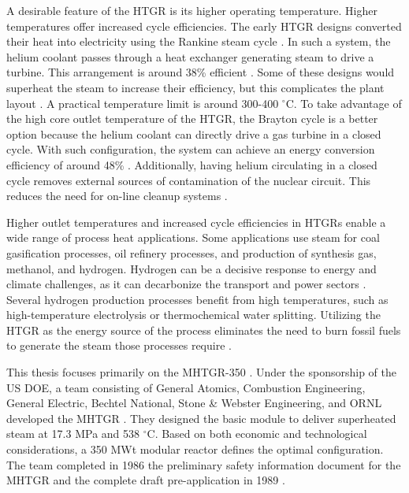 A desirable feature of the \gls{HTGR} is its higher operating temperature.
Higher temperatures offer increased cycle efficiencies.
The early \gls{HTGR} designs converted their heat into electricity using the Rankine steam cycle \cite{herranz_power_2009}.
In such a system, the helium coolant passes through a heat exchanger generating steam to drive a  turbine.
This arrangement is around 38\% efficient \cite{breeze_nuclear_2014}.
Some of these designs would superheat the steam to increase their efficiency, but this complicates the plant layout \cite{ballinger_balance_2004}.
A practical temperature limit is around 300-400 $^{\circ}$C.
To take advantage of the high core outlet temperature of the \gls{HTGR}, the Brayton cycle is a better option because the helium coolant can directly drive a gas turbine in a closed cycle.
With such configuration, the system can achieve an energy conversion efficiency of around 48\% \cite{breeze_nuclear_2014}.
Additionally, having helium circulating in a closed cycle removes external sources of contamination of the nuclear circuit.
This reduces the need for on-line cleanup systems \cite{iaea_current_2001}.

Higher outlet temperatures and increased cycle efficiencies in HTGRs enable a wide range of process heat applications.
Some applications use steam for coal gasification processes, oil refinery processes, and production of synthesis gas, methanol, and hydrogen.
Hydrogen can be a decisive response to energy and climate challenges, as it can decarbonize the transport and power sectors \cite{nagashima_japans_2018}.
Several hydrogen production processes benefit from high temperatures, such as high-temperature electrolysis or thermochemical water splitting.
Utilizing the \gls{HTGR} as the energy source of the process eliminates the need to burn fossil fuels to generate the steam those processes require \cite{iaea_current_2001}.

This thesis focuses primarily on the \gls{MHTGR}-350 \cite{neylan_modular_1988} \cite{silady_licensing_1988}.
Under the sponsorship of the \gls{US} \gls{DOE}, a team consisting of General Atomics, Combustion Engineering, General Electric, Bechtel National, Stone \& Webster Engineering, and \gls{ORNL} developed the \gls{MHTGR} \cite{neylan_modular_1988}.
They designed the basic module to deliver superheated steam at 17.3 MPa and 538 $^{\circ}$C.
Based on both economic and technological considerations, a 350 MWt modular reactor defines the optimal configuration.
The team completed in 1986 the preliminary safety information document for the \gls{MHTGR} and the complete draft pre-application in 1989 \cite{huning_steady_2014}.


